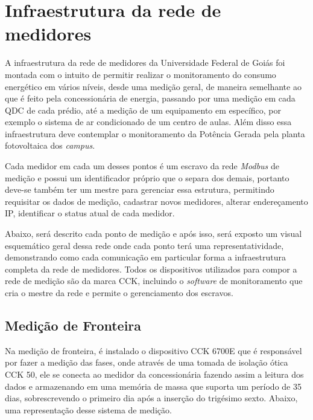 \chapter{Infraestrutura da rede de medidores}
\label{c:infraestrutura_da_rede_de_medidores}
A infraestrutura da rede de medidores da Universidade Federal de Goiás foi montada com o intuito de permitir realizar o monitoramento do consumo energético em vários níveis, desde uma medição geral, de maneira semelhante ao que é feito pela concessionária de energia, passando por uma medição em cada QDC de cada prédio, até a medição de um equipamento em específico, por exemplo o sistema de ar condicionado de um centro de aulas. Além disso essa infraestrutura deve contemplar o monitoramento da Potência Gerada pela planta fotovoltaica dos \textit{campus}.

Cada medidor em cada um desses pontos é um escravo da rede \textit{Modbus} de medição e possui um identificador próprio que o separa dos demais, portanto deve-se também ter um mestre para gerenciar essa estrutura, permitindo requisitar os dados de medição, cadastrar novos medidores, alterar endereçamento IP, identificar o status atual de cada medidor.

Abaixo, será descrito cada ponto de medição e após isso, será exposto um visual esquemático geral dessa rede onde cada ponto terá uma representatividade, demonstrando como cada comunicação em particular forma a infraestrutura completa da rede de medidores. Todos os dispositivos utilizados para compor a rede de medição são da marca CCK, incluindo o \textit{software} de monitoramento que cria o mestre da rede e permite o gerenciamento dos escravos.

\section{Medição de Fronteira}
\label{sec:medicao-de-fronteira}

Na medição de fronteira, é instalado o dispositivo CCK 6700E que é responsável por fazer a medição das fases, onde através de uma tomada de isolação ótica CCK 50, ele se conecta ao medidor da concessionária fazendo assim a leitura dos dados e armazenando em uma memória de massa que suporta um período de 35 dias, sobrescrevendo o primeiro dia após a inserção do trigésimo sexto. Abaixo, uma representação desse sistema de medição.

